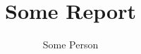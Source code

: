 \documentclass[a4paper]{article}
\title{Some Report}
\author{Some Person}
\begin{document}
\maketitle

\lipsum[1]~\cite{GMP81,DBLP:journals/entcs/CardelliGG07,Tot97}

\lipsum[2]~\cite{DBLP:conf/aplas/CalcagnoDG07,DBLP:journals/tcs/Gardner99}



\end{document}
